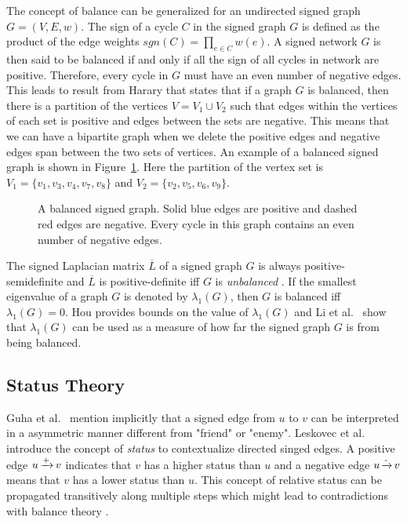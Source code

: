 The concept of balance can be generalized for an undirected signed graph $G=(V,E,w)$. The sign of a cycle $C$ in the signed graph $G$ is defined as the product of the edge weights $sgn(C)=\prod_{e\in C}w(e)$. A signed network $G$ is then said to be balanced if and only if all the sign of all cycles in network are positive. Therefore, every cycle in $G$ must have an even number of negative edges. This leads to result from Harary \cite{harary1953on} that states that if a graph $G$ is balanced, then there is a partition of the vertices $V = V_1 \cup V_2$ such that edges within the vertices of each set is positive and edges between the sets are negative. This means that we can have a bipartite graph when we delete the positive edges and negative edges span between the two sets of vertices. An example of a balanced signed graph is shown in Figure~\ref{fig:balanced-graph}. Here the partition of the vertex set is $V_1 = \{v_1,v_3,v_4,v_7,v_8\}$ and $V_2 = \{v_2,v_5,v_6,v_9\}$.

\begin{figure}[!ht]
    \centering
    
    \caption{ A balanced signed graph. Solid blue edges are positive and dashed red edges are negative. Every cycle in this graph contains an even number of negative edges.}
    \label{fig:balanced-graph}
\end{figure}

The signed Laplacian matrix $\overline{L}$ of a signed graph $G$ is always positive-semidefinite and $\overline{L}$ is positive-definite iff $G$ is \textit{unbalanced} \cite{kunegis2010spectral,hou2005bounds,zaslavsky1982signed}. If the smallest eigenvalue of a graph $G$ is denoted by $\lambda_{1}(G)$, then $G$ is balanced iff $\lambda_{1}(G)=0$. Hou \cite{hou2005bounds} provides bounds on the value of $\lambda_{1}(G)$ and Li et al.\ \cite{li2016note} show that $\lambda_{1}(G)$ can be used as a measure of how far the signed graph $G$ is from being balanced.

\subsection{Status Theory}
\label{sec:status-theory}
Guha et al.\ \cite{guha2004propagation} mention implicitly that a signed edge from $u$ to $v$ can be interpreted in a asymmetric manner different from "friend" or "enemy". Leskovec et al.\ \cite{leskovec2010signed,leskovec2010predicting} introduce the concept of \textit{status} to contextualize directed singed edges. A positive edge $u \operatorname*{\xrightarrow{+}} v$ indicates that $v$ has a higher status than $u$ and a negative edge $u \operatorname*{\xrightarrow{-}} v$ means that $v$ has a lower status than $u$. This concept of relative status can be propagated transitively along multiple steps which might lead to contradictions with balance theory \cite{leskovec2010signed}.

